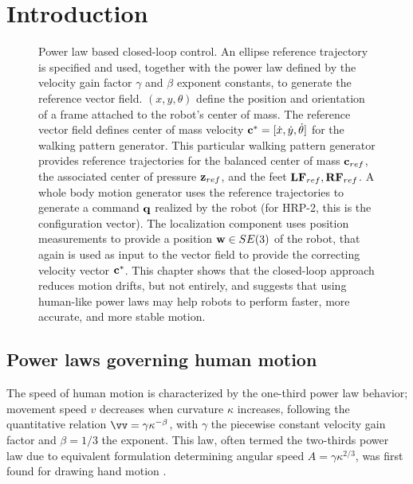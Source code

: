
\section{Introduction}

\begin{figure}[ht]
  \centering
  
  \caption[Control scheme using the one third power law on HRP-2]{Power law based closed-loop control. An ellipse reference trajectory is specified and used, together with the power law defined by the velocity gain factor $\gamma$ and $\beta$ exponent constants, to generate the reference vector field. $(x,y,\theta)$ define the position and orientation of a frame attached to the robot's center of mass. The reference vector field defines center of mass velocity ${\bf c}^*=[\dot{x},\dot{y},\dot{\theta}]$ for the walking pattern generator. This particular walking pattern generator provides reference trajectories for the balanced center of mass ${\bf c}_{ref}$, the associated center of pressure ${\bf z}_{ref}$, and the feet ${\bf LF}_{ref},{\bf RF}_{ref}$. A whole body motion generator uses the reference trajectories to generate a command ${\bf q}$ realized by the robot (for HRP-2, this is the configuration vector). The localization component uses position measurements to provide a position ${\bf w} \in SE(3)$ of the robot, that again is used as input to the vector field to provide the correcting velocity vector ${\bf c}^*$. This chapter shows that the closed-loop approach reduces motion drifts, but not entirely, and suggests that using human-like power laws may help robots to perform faster, more accurate, and more stable motion. 
}
  \label{fig:covertwothirdpowerlaw}
\end{figure}

\subsection{Power laws governing human motion}
The speed of human motion is characterized by the one-third power law behavior;
movement speed $v$ decreases when curvature $\kappa$ increases,
following the quantitative relation $\vv = \gamma \kappa^{-\beta}$,
with $\gamma$ the piecewise constant velocity gain factor and $\beta=1/3$ the exponent.
This law, often termed the two-thirds power law due to equivalent formulation determining
angular speed $A = \gamma \kappa^{2/3}$, was first found for drawing hand motion \cite{lacquaniti_law_1983}.

